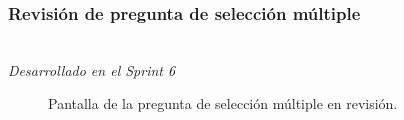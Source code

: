\newpage

\subsubsection{Revisión de pregunta de selección múltiple}\mbox{}\\
\label{sec:pregunic1b}
\textit{Desarrollado en el Sprint 6}

\begin{figure}[H]%
  \centering
  \qquad
  \caption{Pantalla de la pregunta de selección múltiple en revisión.}%
  \label{fig:revisar_multiple}%
\end{figure}

